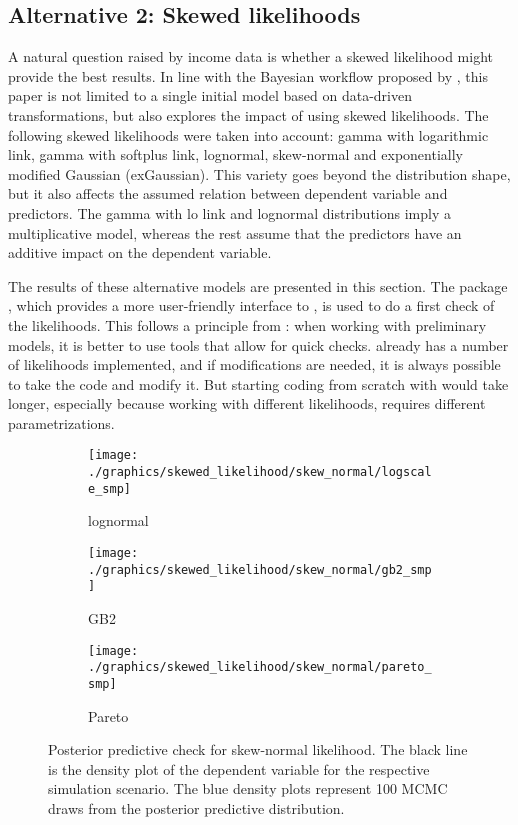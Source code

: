 \subsection{Alternative 2: Skewed likelihoods}
\label{ch:skewed_likelihoods}
A natural question raised by income data is whether a skewed likelihood might provide the best results.
In line with the Bayesian workflow proposed by \cite{gelman_bayesian_2020}, this paper is not limited to a single initial model based on data-driven transformations, but also explores the impact of using skewed likelihoods.
The following skewed likelihoods were taken into account: gamma with logarithmic link, gamma with
softplus link, lognormal, skew-normal and exponentially modified Gaussian (exGaussian).
This variety goes beyond the distribution shape, but it also affects the assumed relation between dependent variable and predictors.
The gamma with lo link and lognormal distributions imply a multiplicative model, whereas the rest assume that the predictors have an additive impact on the dependent variable.

The results of these alternative models are presented in this section.
The package  \citep{burkner_brms_2017}, which provides a more user-friendly interface to , is used to do a first check of the likelihoods.
This follows a principle from \cite{gelman_bayesian_2020}: when working with preliminary models, it is better to use tools that allow for quick checks.
 already has a number of likelihoods implemented, and if modifications are needed, it is always possible to take the  code and modify it.
But starting coding from scratch with  would take longer, especially because working with different likelihoods, requires different parametrizations.

\begin{figure}[t]
    \centering
    \begin{subfigure}{0.29\textwidth}
        \texttt{[image: ./graphics/skewed\_likelihood/skew\_normal/logscale\_smp]}
        \caption{lognormal}
    \end{subfigure}
    \begin{subfigure}{0.29\textwidth}
        \texttt{[image: ./graphics/skewed\_likelihood/skew\_normal/gb2\_smp]}
        \caption{GB2}
    \end{subfigure}
    \begin{subfigure}{0.29\textwidth}
        \texttt{[image: ./graphics/skewed\_likelihood/skew\_normal/pareto\_smp]}
        \caption{Pareto}
    \end{subfigure}

    \caption[Posterior predictive check for skew-normal likelihood]{Posterior predictive check for skew-normal likelihood. The black line is the density plot of the dependent variable for the respective simulation scenario. The blue density plots represent 100 MCMC draws from the posterior predictive distribution.}
    \label{fig:skewnormal_ppc}
\end{figure}

